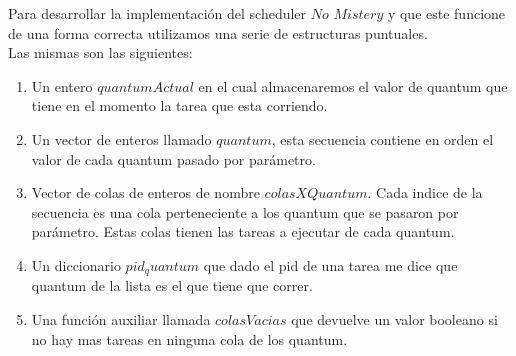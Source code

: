 Para desarrollar la implementación del scheduler $No$ $Mistery$ y que este funcione de una forma correcta
utilizamos una serie de estructuras puntuales. \\
Las mismas son las siguientes:\\
\begin{enumerate}
\item Un entero $quantumActual$ en el cual almacenaremos el valor de quantum que tiene en el momento la tarea que esta corriendo.
\item Un vector de enteros llamado $quantum$, esta secuencia contiene en orden el valor de cada quantum pasado por par\'{a}metro.
\item Vector de colas de enteros de nombre $colasXQuantum$. Cada indice de la secuencia es una cola perteneciente a los quantum 
que se pasaron por par\'{a}metro. Estas colas tienen las tareas a ejecutar de cada quantum.
\item Un diccionario $pid_quantum$ que dado el pid de una tarea me dice que quantum de la lista es el que tiene que correr.
\item Una funci\'{o}n auxiliar llamada $colasVacias$ que devuelve un valor booleano si no hay mas tareas en ninguna cola de los 
quantum.
\end{enumerate}

